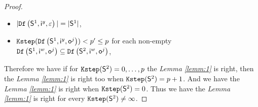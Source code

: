 \begin{appendices}
\begin{proof}
\begin{itemize}
 \item  $|{\tt Df}\left(\mathsf{S}^{1},\mathsf{i}^{y},\varepsilon\right)|=|\mathsf{S}^1|$,
 \item  ${\tt Kstep}({\tt Df}\left(\mathsf{S}^{1},\mathsf{i}^{y},\mathsf{o}^{j}\right))<p'\le p$ for each non-empty ${\tt Df}\left(\mathsf{S}^{1},\mathsf{i}^{w},\mathsf{o}^{j}\right)\subseteq {\tt Df}\left(\mathsf{S}^{2},\mathsf{i}^{w},\mathsf{o}^{j}\right)$,
 \end{itemize} 
 Therefore we have if for ${\tt Kstep}(\mathsf{S}^{2})=0,\ldots, p$ the {\em Lemma \ref{lemm:1}} is right, then the {\em Lemma \ref{lemm:1}} is right too when ${\tt Kstep}(\mathsf{S}^{2})=p+1$. 
And we have the {\em Lemma \ref{lemm:1}} is right when ${\tt Kstep}(\mathsf{S}^{2})=0$. Thus we have the {\em Lemma \ref{lemm:1}} is right for every ${\tt Kstep}(\mathsf{S}^{2})\ne \infty$.
 
\end{proof}


\end{appendices}
